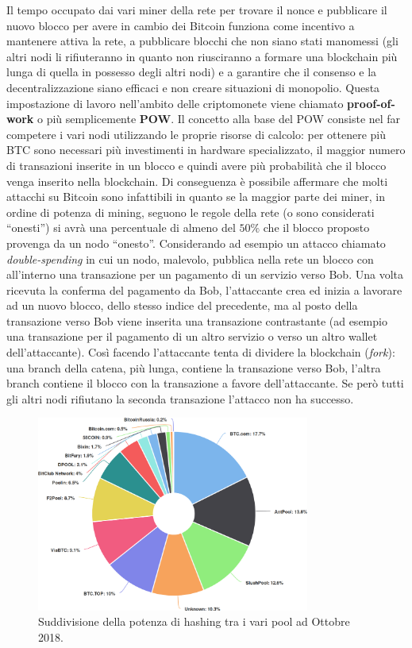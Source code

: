 Il tempo occupato dai vari miner della rete per trovare il nonce e pubblicare il nuovo blocco per avere in cambio dei Bitcoin funziona come incentivo a mantenere attiva la rete, a pubblicare blocchi che non siano stati manomessi (gli altri nodi li rifiuteranno in quanto non riusciranno a formare una blockchain più lunga di quella in possesso degli altri nodi) e a garantire che il consenso e la decentralizzazione siano efficaci e non creare situazioni di monopolio. Questa impostazione di lavoro nell'ambito delle criptomonete viene chiamato \textbf{proof-of-work} o più semplicemente \textbf{POW}. Il concetto alla base del POW consiste nel far competere i vari nodi utilizzando le proprie risorse di calcolo: per ottenere più BTC sono necessari più investimenti in hardware specializzato, il maggior numero di transazioni inserite in un blocco e quindi avere più probabilità che il blocco venga inserito nella blockchain. Di conseguenza è possibile affermare che molti attacchi su Bitcoin sono infattibili in quanto se la maggior parte dei miner, in ordine di potenza di mining, seguono le regole della rete (o sono considerati ``onesti'') si avrà una percentuale di almeno del $50\%$ che il blocco proposto provenga da un nodo ``onesto''.\newnline\newline
Considerando ad esempio un attacco chiamato \textit{double-spending} in cui un nodo, malevolo, pubblica nella rete un blocco con all'interno una transazione per un pagamento di un servizio verso Bob. Una volta ricevuta la conferma del pagamento da Bob, l'attaccante crea ed inizia a lavorare ad un nuovo blocco, dello stesso indice del precedente, ma al posto della transazione verso Bob viene inserita una transazione contrastante (ad esempio una transazione per il pagamento di un altro servizio o verso un altro wallet dell'attaccante). Così facendo l'attaccante tenta di dividere la blockchain (\textit{fork}): una branch della catena, più lunga, contiene la transazione verso Bob, l'altra branch contiene il blocco con la transazione a favore dell'attaccante. Se però tutti gli altri nodi rifiutano la seconda transazione l'attacco non ha successo.
\begin{figure}[H]
    \centering
    \includegraphics[width=0.8\textwidth]{images/hashratedistribution.png}
    \caption{Suddivisione della potenza di hashing tra i vari pool ad Ottobre 2018.}
\end{figure}
